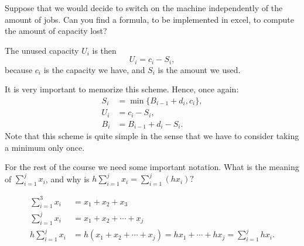 \begin{question}
  Suppose that we would decide to switch on the machine independently
  of the amount of jobs. Can you find a formula, to be implemented in
  excel, to compute the amount of capacity lost?
  \begin{solution}
The unused capacity $U_i$ is then
\begin{equation*}
  U_i = c_i - S_i,
\end{equation*}
because $c_i$ is the capacity we have, and $S_i$ is the amount we
used.

It is very important to memorize this scheme. Hence, once again:
\begin{align*}
      S_i &= \min\{B_{i-1}+d_i, c_i\}, \\
  U_i &= c_i - S_i, \\
  B_i &= B_{i-1}+d_i - S_i.
\end{align*}
Note that this scheme is quite simple in the sense that we have to
consider taking a minimum only once. 

  \end{solution}
\end{question}



\begin{question}
  For the rest of the course we need some important notation. What is the meaning of $\sum_{i=1}^j x_i$, and why is $h \sum_{i=1}^j x_i = \sum_{i=1}^j (hx_i)?$
  \begin{solution}
    \begin{align*}
      \sum_{i=1}^3 x_i &= x_1 + x_2 + x_3 \\
      \sum_{i=1}^j x_i &= x_1 + x_2 + \cdots +x_j \\
     h \sum_{i=1}^j x_i &= h(x_1 + x_2 + \cdots +x_j) = hx_1 + \cdots+hx_j = \sum_{i=1}^j h x_i.
    \end{align*}
  \end{solution}
\end{question}

